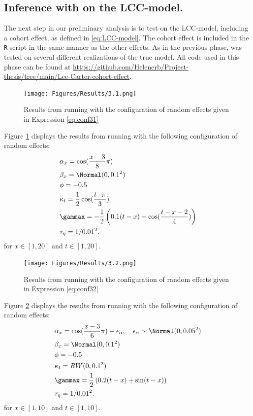 \newline
\subsection{Inference with \inlabru on the LCC-model. }
The next step in our preliminary analysis is to test \inlabru on the LCC-model, including a cohort effect, as defined in \ref{eq:LCC-model}. The cohort effect is included in the \texttt{R} script in the same manner as the other effects. As in the previous phase, \inlabru was tested on several different realizations of the true model. All code used in this phase can be found at \url{https://github.com/Helenerb/Project-thesis/tree/main/Lee-Carter-cohort-effect}.
\begin{figure}[h!]
    \centering
    \texttt{[image: Figures/Results/3.1.png]}
    \caption{Results from running \inlabru with the configuration of random effects given in Expression \ref{eq:conf31}}
    \label{fig:conf31}
\end{figure}
Figure \ref{fig:conf31} displays the results from running \inlabru with the following configuration of random effects:
\begin{equation}
    \begin{aligned}
        &\alpha_x = \cos(\frac{x-3}{8}\pi)\\
        &\beta_x = \Normal(0,0.1^2)\\
        &\phi = -0.5\\
        &\kappa_t = \frac{1}{2}\cos(\frac{t\cdot \pi}{3})\\
        &\gammax = -\frac{1}{2}\left( 0.1(t-x) + \cos(\frac{t-x-2}{4})\right)\\
        &\tau_{\eta} = 1/0.01^2.
    \end{aligned}
    \label{eq:conf31}
\end{equation}
for $x\in[1,20]$ and $t \in [1,20]$. 

\begin{figure}[h!]
    \centering
    \texttt{[image: Figures/Results/3.2.png]}
    \caption{Results from running \inlabru with the configuration of random effects given in Expression \ref{eq:conf32}}
    \label{fig:conf32}
\end{figure}
Figure \ref{fig:conf32} displays the results from running \inlabru with the following configuration of random effects:
\begin{equation}
    \begin{aligned}
        &\alpha_x = \cos(\frac{x-3}{6}\pi) + \epsilon_{\alpha}, \quad \epsilon_{\alpha} \sim \Normal(0,0.05^2)\\
        &\beta_x = \Normal(0,0.1^2)\\
        &\phi = -0.5\\
        &\kappa_t = RW(0,0.1^2)\\
        &\gammax = \frac{1}{2}\left( 0.2(t-x) + \sin(t-x)\right)\\
        &\tau_{\eta} = 1/0.01^2.
    \end{aligned}
    \label{eq:conf32}
\end{equation}
for $x\in[1,10]$ and $t \in [1,10]$. 

